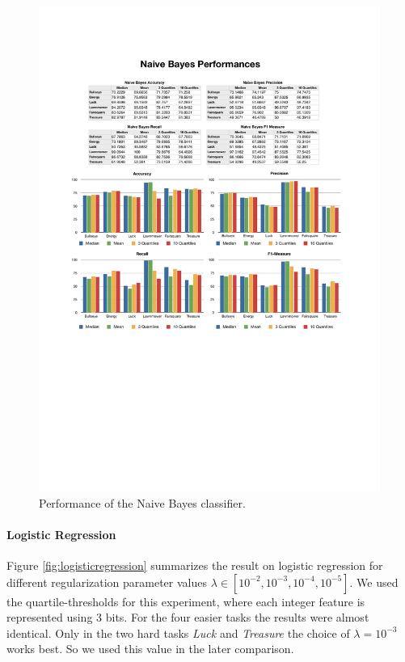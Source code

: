 %
\begin{figure}
    \centering
    \setlength{\tabcolsep}{0.0130\linewidth}
    \includegraphics[width=\linewidth]{figures/NaiveBayes}
    \caption{Performance of the Naive Bayes classifier.%
      \label{fig:naivebayes}}
\end{figure}

\paragraph*{Logistic Regression}
Figure \ref{fig:logisticregression} summarizes the result on logistic regression for different regularization parameter values $\lambda \in [10^{-2}, 10^{-3}, 10^{-4}, 10^{-5}]$. We used the quartile-thresholds for this experiment, where each integer feature is represented using 3 bits. For the four easier tasks the results were almost identical. Only in the two hard tasks \emph{Luck} and \emph{Treasure} the choice of $\lambda = 10^{-3}$ works best. So we used this value in the later comparison.

